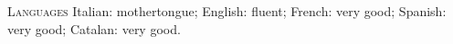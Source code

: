 \begin{paracol}{2}
  \textsc{Languages}
\switchcolumn
  Italian: mothertongue; English: fluent; French: very good; Spanish: very good; Catalan: very good.
\end{paracol}